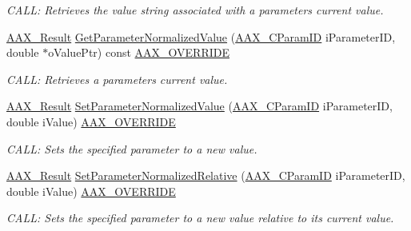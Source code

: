 \begin{Indent}
\begin{DoxyCompactItemize}
\begin{DoxyCompactList}\small\item\em C\+A\+LL\+: Retrieves the value string associated with a parameter\textquotesingle{}s current value. \end{DoxyCompactList}\item 
\mbox{\hyperlink{a00392_a4d8f69a697df7f70c3a8e9b8ee130d2f}{A\+A\+X\+\_\+\+Result}} \mbox{\hyperlink{a01481_ae2892335e4613cfd427fc636b483fceb}{Get\+Parameter\+Normalized\+Value}} (\mbox{\hyperlink{a00392_a1440c756fe5cb158b78193b2fc1780d1}{A\+A\+X\+\_\+\+C\+Param\+ID}} i\+Parameter\+ID, double $\ast$o\+Value\+Ptr) const \mbox{\hyperlink{a00392_ac2f24a5172689ae684344abdcce55463}{A\+A\+X\+\_\+\+O\+V\+E\+R\+R\+I\+DE}}
\begin{DoxyCompactList}\small\item\em C\+A\+LL\+: Retrieves a parameter\textquotesingle{}s current value. \end{DoxyCompactList}\item 
\mbox{\hyperlink{a00392_a4d8f69a697df7f70c3a8e9b8ee130d2f}{A\+A\+X\+\_\+\+Result}} \mbox{\hyperlink{a01481_a8eabaa279c51e74b30d3d2ffa5c865cb}{Set\+Parameter\+Normalized\+Value}} (\mbox{\hyperlink{a00392_a1440c756fe5cb158b78193b2fc1780d1}{A\+A\+X\+\_\+\+C\+Param\+ID}} i\+Parameter\+ID, double i\+Value) \mbox{\hyperlink{a00392_ac2f24a5172689ae684344abdcce55463}{A\+A\+X\+\_\+\+O\+V\+E\+R\+R\+I\+DE}}
\begin{DoxyCompactList}\small\item\em C\+A\+LL\+: Sets the specified parameter to a new value. \end{DoxyCompactList}\item 
\mbox{\hyperlink{a00392_a4d8f69a697df7f70c3a8e9b8ee130d2f}{A\+A\+X\+\_\+\+Result}} \mbox{\hyperlink{a01481_a2191024666f779ea95e89e03fc76a7a8}{Set\+Parameter\+Normalized\+Relative}} (\mbox{\hyperlink{a00392_a1440c756fe5cb158b78193b2fc1780d1}{A\+A\+X\+\_\+\+C\+Param\+ID}} i\+Parameter\+ID, double i\+Value) \mbox{\hyperlink{a00392_ac2f24a5172689ae684344abdcce55463}{A\+A\+X\+\_\+\+O\+V\+E\+R\+R\+I\+DE}}
\begin{DoxyCompactList}\small\item\em C\+A\+LL\+: Sets the specified parameter to a new value relative to its current value. \end{DoxyCompactList}\end{DoxyCompactItemize}
\end{Indent}
